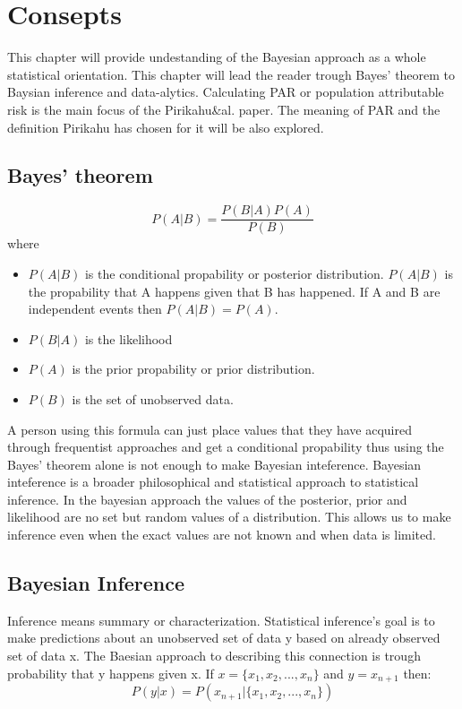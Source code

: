 \chapter{Consepts} \label{sec:Consepts}

This chapter will provide undestanding of the Bayesian approach as a whole statistical orientation. This chapter will lead the reader trough Bayes' theorem to Baysian inference and data-alytics. Calculating PAR or population attributable risk is the main focus of the Pirikahu\&al. paper. The meaning of PAR and the definition Pirikahu has chosen for it will be also explored.  

\section{Bayes' theorem}\label{BayesianTheorem}
\begin{equation}
P(A|B) = \frac{P(B|A)P(A)}{P(B)}
\end{equation}
where
\begin{itemize}
    \item $P(A|B)$ is the conditional propability\cite{Gut2005ProbabilityAG} or posterior distribution.\cite{Mcelreath2015StatisticalRA} $P(A|B)$ is the propability that A happens given that B has happened. If A and B are independent events then $P(A|B) = P(A)$. \cite{Gut2005ProbabilityAG}
    \item $P(B|A)$ is the likelihood\cite{Gut2005ProbabilityAG}\cite{Mcelreath2015StatisticalRA}
    \item $P(A)$ is the prior propability\cite{Gut2005ProbabilityAG} or prior distribution.\cite{Mcelreath2015StatisticalRA}
    \item $P(B)$ is the set of unobserved data. 
\end{itemize}

A person using this formula can just place values that they have acquired through frequentist approaches and get a conditional propability thus using the Bayes' theorem alone is not enough to make Bayesian inteference. Bayesian inteference is a broader philosophical and statistical approach to statistical inference.\cite{Mcelreath2015StatisticalRA} In the bayesian approach the values of the posterior, prior and likelihood are no set but random values of a distribution.\cite{Gut2005ProbabilityAG} This allows us to make inference even when the exact values are not known and when data is limited.

\section{Bayesian Inference}\label{BayesianInference}
Inference means summary or characterization\cite{Robert2007TheBC}. Statistical inference's goal is to make predictions about an unobserved set of data y based on already observed set of data x.\cite{Lindley1990The1W}\cite{Gel2014BayesianDA} The Baesian approach to describing this connection is trough probability that y happens given x. If $x = \{x_1, x_2, ..., x_n \}$ and $y = x_{n + 1}$ then:
\begin{equation}
P(y|x) = P(x_{n + 1}|\{x_1, x_2, ..., x_n \})
\end{equation}

